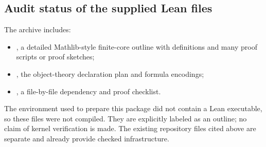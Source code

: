 \subsection{Audit status of the supplied Lean files}

The archive includes:
\begin{itemize}
\item {}, a detailed Mathlib-style finite-core
outline with definitions and many proof scripts or proof sketches;
\item {}, the object-theory declaration plan and
formula encodings;
\item {}, a file-by-file dependency and proof
checklist.
\end{itemize}
The environment used to prepare this package did not contain a Lean executable,
so these files were not compiled.  They are explicitly labeled as an outline;
no claim of kernel verification is made.  The existing repository files cited
above are separate and already provide checked infrastructure.
